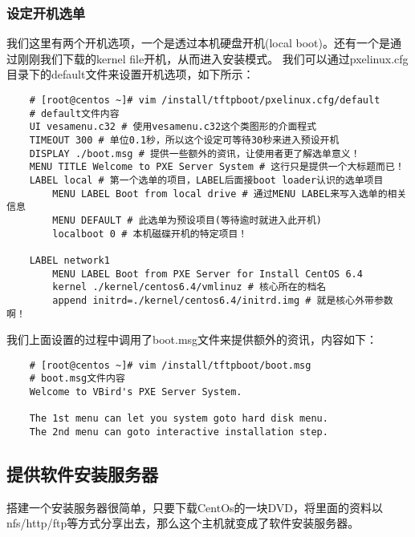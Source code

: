 \documentclass[a4paper,left=1.5cm,right=1.5cm,11pt]{article}
\begin{document}
\subsubsection{设定开机选单}
	我们这里有两个开机选项，一个是透过本机硬盘开机(local boot)。还有一个是通过刚刚我们下载的kernel file开机，从而进入安装模式。
	我们可以通过pxelinux.cfg目录下的default文件来设置开机选项，如下所示：
	\begin{lstlisting}
	# [root@centos ~]# vim /install/tftpboot/pxelinux.cfg/default
	# default文件内容
	UI vesamenu.c32 # 使用vesamenu.c32这个类图形的介面程式 
	TIMEOUT 300 # 单位0.1秒，所以这个设定可等待30秒来进入预设开机 
	DISPLAY ./boot.msg # 提供一些额外的资讯，让使用者更了解选单意义！ 
	MENU TITLE Welcome to PXE Server System # 这行只是提供一个大标题而已！ 
	LABEL local # 第一个选单的项目，LABEL后面接boot loader认识的选单项目
		MENU LABEL Boot from local drive # 通过MENU LABEL来写入选单的相关信息
		MENU DEFAULT # 此选单为预设项目(等待逾时就进入此开机) 
		localboot 0 # 本机磁碟开机的特定项目！ 

	LABEL network1 
		MENU LABEL Boot from PXE Server for Install CentOS 6.4 
		kernel ./kernel/centos6.4/vmlinuz # 核心所在的档名 
		append initrd=./kernel/centos6.4/initrd.img # 就是核心外带参数啊！
	\end{lstlisting}

	我们上面设置的过程中调用了boot.msg文件来提供额外的资讯，内容如下：
	\begin{lstlisting}
	# [root@centos ~]# vim /install/tftpboot/boot.msg
	# boot.msg文件内容
	Welcome to VBird's PXE Server System.

	The 1st menu can let you system goto hard disk menu.
	The 2nd menu can goto interactive installation step.
	\end{lstlisting}

\subsection{提供软件安装服务器}
	搭建一个安装服务器很简单，只要下载CentOs的一块DVD，将里面的资料以nfs/http/ftp等方式分享出去，那么这个主机就变成了软件安装服务器。\par
\end{document}
